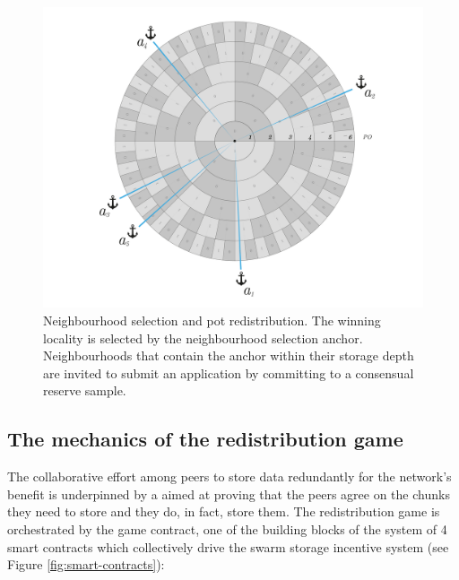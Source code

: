 \begin{figure}[!ht]
  \centering
    \includegraphics[width=\textwidth]{fig/nhd-selection.pdf}
  \caption[Neighbourhood selection and pot redistribution]{Neighbourhood selection and pot redistribution. The winning locality is selected by the neighbourhood selection anchor. Neighbourhoods that contain the anchor within their storage depth are invited to submit an application by committing to a consensual reserve sample. }
\label{fig:neighbourhood-selection}
\end{figure}    

    


\subsection{The mechanics of the redistribution game}\label{sec:mechanics}

The collaborative effort among peers to store data redundantly for the network's benefit is underpinned by a 
aimed at proving that the peers agree on the chunks they need to store and they do, in fact, store them. The redistribution game is orchestrated by the game contract, one of the building blocks of the system of 4 smart contracts which collectively drive the swarm storage incentive system (see Figure \ref{fig:smart-contracts}):

